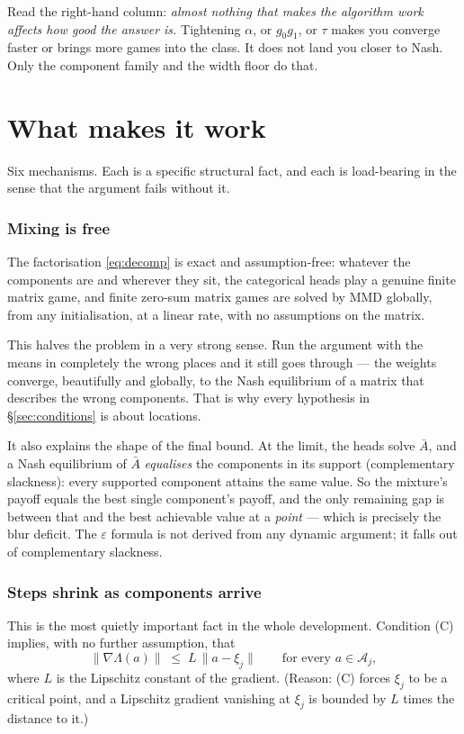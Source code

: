 \documentclass[11pt]{article}
\theoremstyle{definition}
\newcommand{\cA}{\mathcal{A}}
\begin{document}
\noindent
Read the right-hand column: \emph{almost nothing that makes the algorithm work
affects how good the answer is.} Tightening $\alpha$, or $g_0g_1$, or $\tau$ makes
you converge faster or brings more games into the class. It does not land you
closer to Nash. Only the component family and the width floor do that.

\part{What makes it work}

Six mechanisms. Each is a specific structural fact, and each is load-bearing in
the sense that the argument fails without it.

\section{Mixing is free}

The factorisation \eqref{eq:decomp} is exact and assumption-free: whatever the
components are and wherever they sit, the categorical heads play a genuine finite
matrix game, and finite zero-sum matrix games are solved by MMD globally, from
any initialisation, at a linear rate, with no assumptions on the matrix.

This halves the problem in a very strong sense. Run the argument with the means
in completely the wrong places and it still goes through --- the weights converge,
beautifully and globally, to the Nash equilibrium of a matrix that describes the
wrong components. That is why every hypothesis in \S\ref{sec:conditions} is about
locations.

It also explains the shape of the final bound. At the limit, the heads solve
$\bar A$, and a Nash equilibrium of $\bar A$ \emph{equalises} the components in
its support (complementary slackness): every supported component attains the same
value. So the mixture's payoff equals the best single component's payoff, and the
only remaining gap is between that and the best achievable value at a
\emph{point} --- which is precisely the blur deficit. The $\varepsilon$ formula is
not derived from any dynamic argument; it falls out of complementary slackness.

\section{Steps shrink as components arrive}\label{sec:vanish}

This is the most quietly important fact in the whole development. Condition (C)
implies, with no further assumption, that
\begin{equation}\label{eq:dominated}
  \|\nabla\Lambda(a)\| \;\le\; L\,\|a - \xi_j\|
  \qquad\text{for every } a \in \cA_j ,
\end{equation}
where $L$ is the Lipschitz constant of the gradient. (Reason: (C) forces $\xi_j$
to be a critical point, and a Lipschitz gradient vanishing at $\xi_j$ is bounded
by $L$ times the distance to it.)
\end{document}
